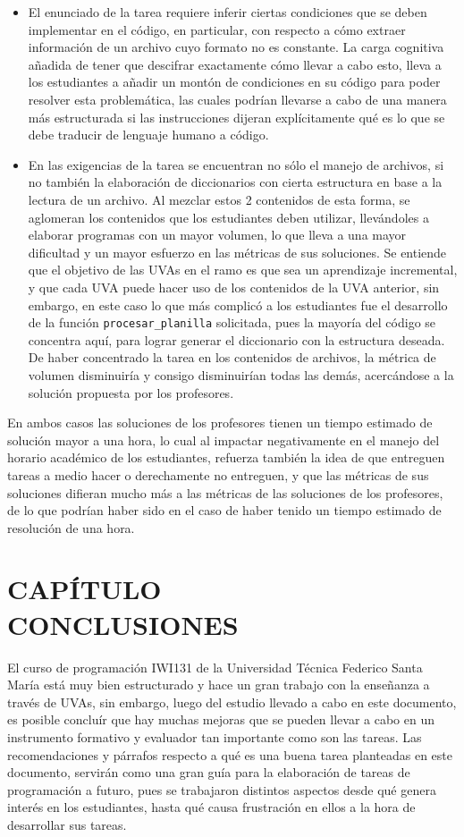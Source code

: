 \documentclass[letterpaper,12pt]{article}
\newcommand{\secnumbersection}[1]{
\addtocounter{section}{1}
\section*{CAPÍTULO \thesection \texorpdfstring{\\}\ #1}
\addcontentsline{toc}{section}{CAPÍTULO \thesection : #1}
\setcounter{subsection}{0}
}
\begin{document}
\begin{itemize}
  \item El enunciado de la tarea requiere inferir ciertas condiciones que se deben implementar en el código, en particular, con respecto a cómo extraer información de un archivo cuyo formato no es constante. La carga cognitiva añadida de tener que descifrar exactamente cómo llevar a cabo esto, lleva a los estudiantes a añadir un montón de condiciones en su código para poder resolver esta problemática, las cuales podrían llevarse a cabo de una manera más estructurada si las instrucciones dijeran explícitamente qué es lo que se debe traducir de lenguaje humano a código.
  \item En las exigencias de la tarea se encuentran no sólo el manejo de archivos, si no también la elaboración de diccionarios con cierta estructura en base a la lectura de un archivo. Al mezclar estos 2 contenidos de esta forma, se aglomeran los contenidos que los estudiantes deben utilizar, llevándoles a elaborar programas con un mayor volumen, lo que lleva a una mayor dificultad y un mayor esfuerzo en las métricas de sus soluciones. Se entiende que el objetivo de las UVAs en el ramo es que sea un aprendizaje incremental, y que cada UVA puede hacer uso de los contenidos de la UVA anterior, sin embargo, en este caso lo que más complicó a los estudiantes fue el desarrollo de la función \texttt{procesar\_planilla} solicitada, pues la mayoría del código se concentra aquí, para lograr generar el diccionario con la estructura deseada. De haber concentrado la tarea en los contenidos de archivos, la métrica de volumen disminuiría y consigo disminuirían todas las demás, acercándose a la solución propuesta por los profesores.
\end{itemize}

En ambos casos las soluciones de los profesores tienen un tiempo estimado de solución mayor a una hora, lo cual al impactar negativamente en el manejo del horario académico de los estudiantes, refuerza también la idea de que entreguen tareas a medio hacer o derechamente no entreguen, y que las métricas de sus soluciones difieran mucho más a las métricas de las soluciones de los profesores, de lo que podrían haber sido en el caso de haber tenido un tiempo estimado de resolución de una hora.

\newpage

\secnumbersection{CONCLUSIONES} \label{sec:conclusiones}

El curso de programación IWI131 de la Universidad Técnica Federico Santa María está muy bien estructurado y hace un gran trabajo con la enseñanza a través de UVAs, sin embargo, luego del estudio llevado a cabo en este documento, es posible concluír que hay muchas mejoras que se pueden llevar a cabo en un instrumento formativo y evaluador tan importante como son las tareas. Las recomendaciones y párrafos respecto a qué es una buena tarea planteadas en este documento, servirán como una gran guía para la elaboración de tareas de programación a futuro, pues se trabajaron distintos aspectos desde qué genera interés en los estudiantes, hasta qué causa frustración en ellos a la hora de desarrollar sus tareas.
\end{document}
